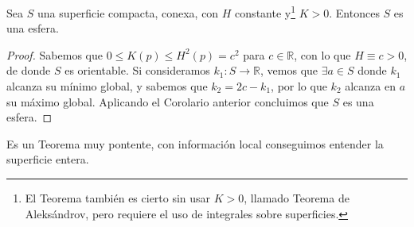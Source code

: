 \begin{coro}
    Sea $S$ una superficie compacta, conexa, con $H$ constante y\footnote{El Teorema también es cierto sin usar $K>0$, llamado Teorema de Aleksándrov, pero requiere el uso de integrales sobre superficies.} $K>0$. Entonces $S$ es una esfera.
    \begin{proof}
        Sabemos que $0\leq K(p)\leq H^2(p) = c^2$ para $c\in \mathbb{R}$, con lo que $H\equiv c>0$, de donde $S$ es orientable. Si consideramos $k_1:S\to\mathbb{R}$, vemos que $\exists a\in S$ donde $k_1$ alcanza su mínimo global, y sabemos que $k_2 = 2c-k_1$, por lo que $k_2$ alcanza en $a$ su máximo global. Aplicando el Corolario anterior concluimos que $S$ es una esfera.
    \end{proof}
\end{coro}

\noindent
Es un Teorema muy pontente, con información local conseguimos entender la superficie entera.
